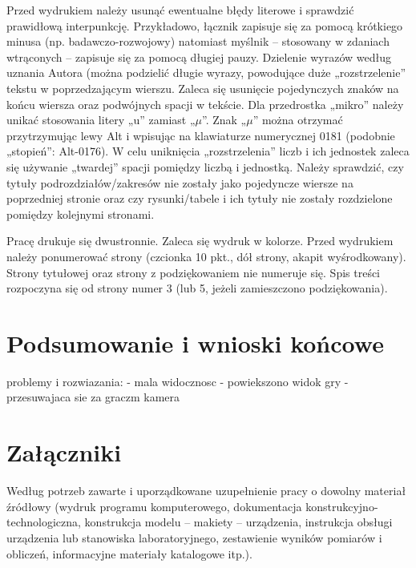 \documentclass[12pt,twoside]{article}
\begin{document}
Przed wydrukiem należy usunąć ewentualne błędy literowe i sprawdzić prawidłową
interpunkcję. Przykładowo, łącznik zapisuje się za pomocą krótkiego minusa (np.
badawczo-rozwojowy) natomiast myślnik -- stosowany w zdaniach wtrąconych -- zapisuje
się za pomocą długiej pauzy. Dzielenie wyrazów według uznania Autora (można podzielić
długie wyrazy, powodujące duże „rozstrzelenie” tekstu w poprzedzającym wierszu. Zaleca się usunięcie pojedynczych znaków na końcu wiersza oraz podwójnych spacji w tekście.
Dla przedrostka „mikro” należy unikać stosowania litery „u” zamiast „$\mu$”. Znak „$\mu$” można
otrzymać przytrzymując lewy Alt i wpisując na klawiaturze numerycznej 0181 (podobnie
„stopień”: Alt-0176). W celu uniknięcia „rozstrzelenia” liczb i ich jednostek zaleca się
używanie „twardej” spacji pomiędzy liczbą i jednostką. Należy sprawdzić, czy tytuły
podrozdziałów/zakresów nie zostały jako pojedyncze wiersze na poprzedniej stronie oraz
czy rysunki/tabele i ich tytuły nie zostały rozdzielone pomiędzy kolejnymi stronami.

Pracę drukuje się dwustronnie. Zaleca się wydruk w kolorze. Przed wydrukiem
należy ponumerować strony (czcionka 10 pkt., dół strony, akapit wyśrodkowany). Strony
tytułowej oraz strony z podziękowaniem nie numeruje się. Spis treści rozpoczyna się od
strony numer 3 (lub 5, jeżeli zamieszczono podziękowania).

\clearpage

\section{Podsumowanie i wnioski końcowe}


problemy i rozwiazania:
- mala widocznosc - powiekszono widok gry - przesuwajaca sie za graczm kamera


\clearpage

\section*{Załączniki}

Według potrzeb zawarte i uporządkowane uzupełnienie pracy o dowolny materiał źródłowy (wydruk programu komputerowego, dokumentacja kons\-truk\-cyj\-no-\-tech\-no\-lo\-gicz\-na, konstrukcja modelu -- makiety -- urządzenia, instrukcja obsługi urządzenia lub stanowiska laboratoryjnego, zestawienie wyników pomiarów i obliczeń, informacyjne materiały katalogowe itp.).


\clearpage
\end{document}

